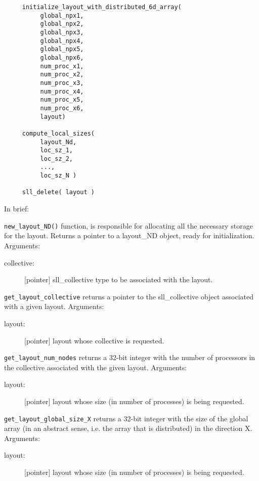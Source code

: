 \documentclass[]{report}   %
\begin{document}
\begin{verbatim}
     initialize_layout_with_distributed_6d_array( 
          global_npx1, 
          global_npx2, 
          global_npx3, 
          global_npx4, 
          global_npx5, 
          global_npx6, 
          num_proc_x1, 
          num_proc_x2, 
          num_proc_x3, 
          num_proc_x4, 
          num_proc_x5, 
          num_proc_x6, 
          layout)

     compute_local_sizes( 
          layout_Nd, 
          loc_sz_1, 
          loc_sz_2, 
          ..., 
          loc_sz_N )

     sll_delete( layout )

\end{verbatim}

In brief:

\begin{description}

	\item \verb+new_layout_ND()+ function, is responsible for allocating all the necessary storage for the layout. Returns a pointer to a layout\_ND object, ready for initialization. Arguments:

	\begin{description}
		\item[collective:] 
[pointer] sll\_collective type to be associated with the layout.
          \end{description}
          
          \item \verb+get_layout_collective+ returns a pointer to the sll\_collective object associated with a given layout. Arguments:
          \begin{description}
                    \item[layout:]
                    [pointer] layout whose collective is requested.
          \end{description}
          
          \item \verb+get_layout_num_nodes+ returns a 32-bit integer with the number of processors in the collective associated with the given layout. Arguments:
          \begin{description}
               \item[layout:]
               [pointer] layout whose size (in number of processes) is being requested.
          \end{description}
          
          \item \verb+get_layout_global_size_X+ returns a 32-bit integer with the size of the global array (in an abstract sense, i.e. the array that is distributed) in the direction X. Arguments:
          \begin{description}
               \item[layout:]
               [pointer] layout whose size (in number of processes) is being requested.
          \end{description}
          

\end{description}
\end{document}
